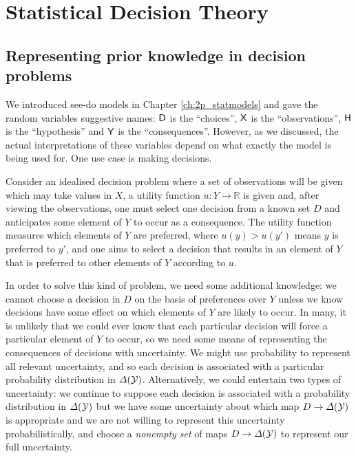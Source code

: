 
\chapter{Statistical Decision Theory}

\section{Representing prior knowledge in decision problems}

We introduced see-do models in Chapter \ref{ch:2p_statmodels} and gave the random variables suggestive names: $\mathsf{D}$ is the ``choices'', $\mathsf{X}$ is the ``observations'', $\mathsf{H}$ is the ``hypothesis'' and $\mathsf{Y}$ is the ``consequences''. However, as we discussed, the actual interpretations of these variables depend on what exactly the model is being used for. One use case is making decisions. 

Consider an idealised decision problem where a set of observations will be given which may take values in $X$, a utility function $u:Y\to \mathbb{R}$ is given and, after viewing the observations, one must select one decision from a known set $D$ and anticipates some element of $Y$ to occur as a consequence. The utility function measures which elements of $Y$ are preferred, where $u(y)>u(y')$ means $y$ is preferred to $y'$, and one aims to select a decision that results in an element of $Y$ that is preferred to other elements of $Y$ according to $u$.

In order to solve this kind of problem, we need some additional knowledge: we cannot choose a decision in $D$ on the basis of preferences over $Y$ unless we know decisions have some effect on which elements of $Y$ are likely to occur. In many, it is unlikely that we could ever know that each particular decision will force a particular element of $Y$ to occur, so we need some means of representing the consequences of decisions with uncertainty. We might use probability to represent all relevant uncertainty, and so each decision is associated with a particular probability distribution in $\Delta(\mathcal{Y})$. Alternatively, we could entertain two types of uncertainty: we continue to suppose each decision is associated with a probability distribution in $\Delta(\mathcal{Y})$ but we have some uncertainty about which map $D\to\Delta(\mathcal{Y})$ is appropriate and we are not willing to represent this uncertainty probabilistically, and choose a \emph{nonempty set} of maps $D\to \Delta(\mathcal{Y})$ to represent our full uncertainty. 

